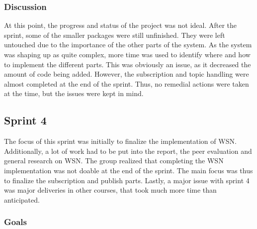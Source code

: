 \subsubsection{Discussion}
\label{subsec:project_lifecycle-development-sprint_3-discussion}

At this point, the progress and status of the project was not ideal. After the sprint, some of the smaller packages were still unfinished. They were left untouched due to the importance of the other parts of the system. As the system was shaping up as quite complex, more time was used to identify where and how to implement the different parts. This was obviously an issue, as it decreased the amount of code being added. However, the subscription and topic handling were almost completed at the end of the sprint. Thus, no remedial actions were taken at the time, but the issues were kept in mind.


\subsection{Sprint 4}
\label{subsec:project_lifecycle-development-sprint_4}

The focus of this sprint was initially to finalize the implementation of WSN. Additionally, a lot of work had to be put into the report, the peer evaluation and general research on WSN. The group realized that completing the WSN implementation was not doable at the end of the sprint. The main focus was thus to finalize the subscription and publish parts. Lastly, a major issue with sprint 4 was major deliveries in other courses, that took much more time than anticipated.

\subsubsection{Goals}
\label{subsec:project_lifecycle-development-sprint_4-goals}

